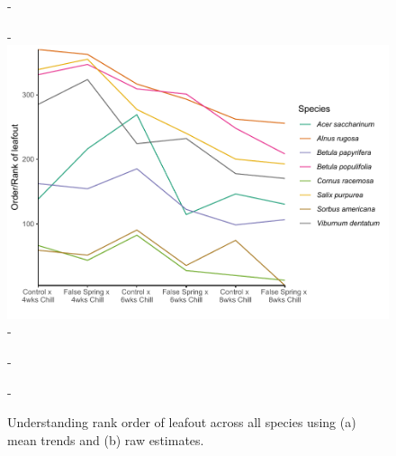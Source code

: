 \documentclass{article}\usepackage[]{graphicx}\usepackage[]{color}
\begin{document}
{\begin{figure} [H]
  -\begin{center}
  -\includegraphics[width=12cm]{..//analyses/figures/budsetorder_byrank.pdf} 
  -\caption{Understanding rank order of leafout across all species using (a) mean trends and (b) raw estimates. }\label{fig:bsetrank}
  -\end{center}
  -\end{figure}}


\end{document}
